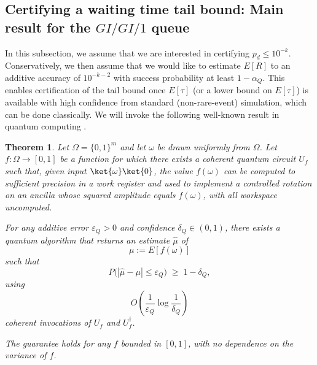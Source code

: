 \documentclass[11pt]{article}
\newtheorem{theorem}{Theorem}
\begin{document}
\subsection{Certifying a waiting time tail bound: Main result for the $GI/GI/1$ queue}
\label{sec:certify-tail}


In this subsection, we assume that we are interested in certifying $p_d \le 10^{-k}$.
Conservatively, we then
assume that we would like to estimate $E[R]$ to an additive accuracy of $10^{-k-2}$ with success
probability at least $1-\alpha_Q$.
This enables certification of the tail bound
once $E[\tau]$ (or a lower bound on $E[\tau]$) is available
with high confidence from standard (non-rare-event) simulation, which can be done classically.
We will invoke the following well-known result in quantum computing \cite{brassard2002quantum, montanaro2015quantum}.
\begin{theorem}
\label{thm:qae}
Let $\Omega=\{0,1\}^m$ and let $\omega$ be drawn uniformly from $\Omega$.
Let $f:\Omega\to[0,1]$ be a function for which there exists a coherent
quantum circuit $U_f$ such that, given input $\ket{\omega}\ket{0}$,
the value $f(\omega)$ can be computed to sufficient precision in a work
register and used to implement a controlled rotation on an ancilla whose
squared amplitude equals $f(\omega)$, with all workspace uncomputed.

For any additive error $\varepsilon_Q>0$ and confidence
$\delta_Q\in(0,1)$, there exists a quantum algorithm that returns an estimate
$\hat\mu$ of
\[
\mu := E[f(\omega)]
\]
such that
\[
P\!\bigl(|\hat\mu-\mu|\le \varepsilon_Q\bigr)\;\ge\;1-\delta_Q,
\]
using
\[
O\!\left(\frac{1}{\varepsilon_Q}\log\frac{1}{\delta_Q}\right)
\]
coherent invocations of $U_f$ and $U_f^\dagger$.

The guarantee holds for any $f$ bounded in $[0,1]$, with no dependence on the
variance of $f$.
\end{theorem}
\end{document}
